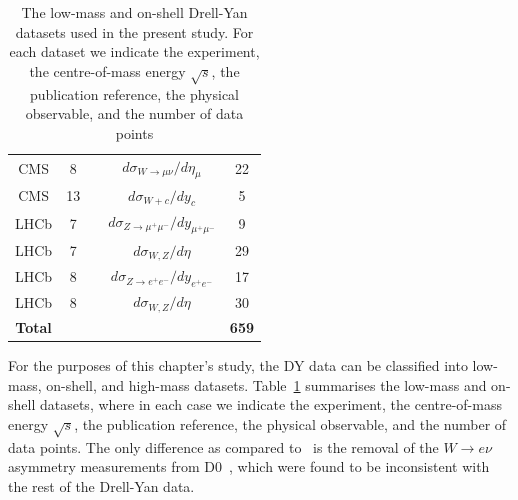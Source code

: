 \documentclass[withindex,glossary]{cam-thesis}
\begin{document}
\begin{table}[H]
\begin{center}
\begin{tabular}{ c c c c c }
 CMS    & 8 	& \cite{Khachatryan:2016pev}	  & $d\sigma_{W\rightarrow \mu\nu}/d\eta_\mu$  & 22 \\
 CMS 	& 13 	& \cite{Sirunyan:2018hde}	  & $d\sigma_{W+c}/dy_c$			              & 5 \\
 \midrule
 LHCb   & 7     & \cite{Aaij:2012vn}              & $d\sigma_{Z\rightarrow\mu^+\mu^-}/dy_{\mu^+\mu^-}$   & 9 \\
 LHCb   & 7     & \cite{Aaij:2015gna}             & $d\sigma_{W,Z}/d\eta$ & 29 \\
 LHCb   & 8     & \cite{Aaij:2012mda}             & $d\sigma_{Z \rightarrow e^+e^-}/dy_{e^+e^-}$         & 17 \\
 LHCb   & 8     & \cite{Aaij:2015zlq}             & $d\sigma_{W,Z}/d\eta$           & 30 \\
 \midrule
 {\bf Total}  &       &                                  &                                       & {\bf 659} \\
 \bottomrule
\end{tabular}
\end{center}
\caption{\small The low-mass and on-shell Drell-Yan datasets used in the present study.
  For each dataset we indicate the experiment, the centre-of-mass energy $\sqrt{s}$,
  the publication reference, the physical observable, and the number of data points
}
\label{tab:data-low-mass}
\end{table}

For the purposes of this chapter's study, the DY data can be classified into low-mass,
on-shell, and high-mass datasets.
%
Table~\ref{tab:data-low-mass} summarises
the low-mass and on-shell datasets, where in 
each case we indicate the experiment, the centre-of-mass energy $\sqrt{s}$,
the publication reference, the physical observable, and the number of data points.
%
The only difference as compared to~\cite{Faura:2020oom} is the removal of the $W\to e\nu$
asymmetry measurements from D0~\cite{D0:2014kma}, which were found to be inconsistent
with the rest of the Drell-Yan data.
\end{document}
